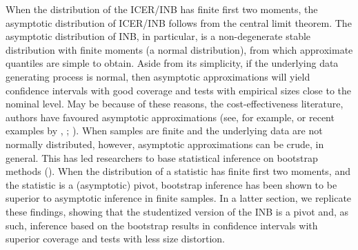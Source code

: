 \documentclass[english, 11pt,a4paper, ]{article}
\begin{document}
When the distribution of the ICER/INB has finite first two moments, the asymptotic distribution of ICER/INB follows from the central limit theorem. The asymptotic distribution of INB, in particular, is a non-degenerate stable distribution with finite moments (a normal distribution), from which approximate quantiles are simple to obtain. Aside from its simplicity, if the underlying data generating process is normal, then asymptotic approximations will yield confidence intervals with good coverage and tests with empirical sizes close to the nominal level. May be because of these reasons, the cost-effectiveness literature, authors have favoured asymptotic approximations (see, for example, \citealp{NixonWonderlingGrieve2010HealthEconomics} or recent examples by \citealp{benEtal2022ejhe}, \citealp{fatoye2022britJournalPain}; \citealp{tsiplova2022researchAutism}). When samples are finite and the underlying data are not normally distributed, however, asymptotic approximations can be crude, in general. This has led researchers to base statistical inference on bootstrap methods (\citealp{Efron1979AoS}). When the  distribution of a statistic has finite first two moments, and the statistic is a (asymptotic) pivot,  bootstrap inference has been shown to be superior to asymptotic inference in finite samples.  In a latter section, we replicate these findings, showing that the studentized version of the INB is a pivot and, as such, inference based on the bootstrap results in confidence intervals with superior coverage and tests with less size distortion. 
\end{document}
